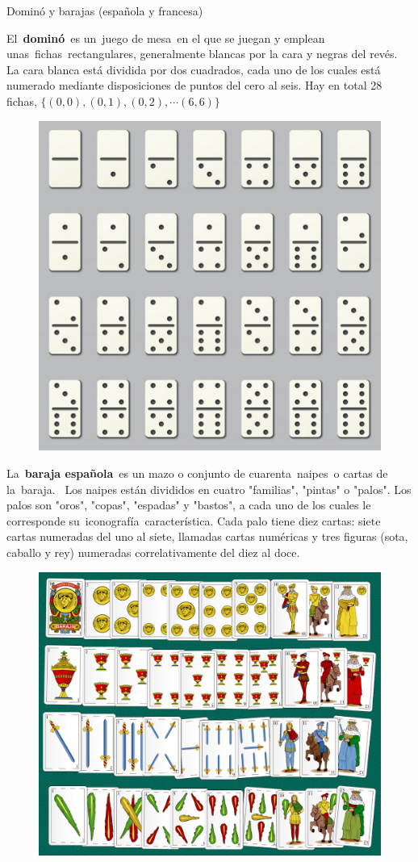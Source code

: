 \begin{myexampleblock}{Dominó y barajas (española y francesa)}

\begin{small}
El \textbf{dominó} es un juego de mesa en el que se juegan y emplean unas fichas rectangulares, generalmente blancas por la cara y negras del revés. La cara blanca está dividida por dos cuadrados, cada uno de los cuales está numerado mediante disposiciones de puntos del cero al seis. Hay en total 28 fichas,  $\{(0,0),(0,1),(0,2), \cdots (6,6)\}$
	\begin{figure}[H]
			\centering
			\includegraphics[width=.6\textwidth]{imagenes/imagenes02/T02IM19.png}
	\end{figure}

\vspace{2mm} La \textbf{baraja española} es un mazo o conjunto de cuarenta naipes o cartas de la baraja.  Los naipes están divididos en cuatro "familias", "pintas" o "palos". Los palos son "oros", "copas", "espadas" y "bastos", a cada uno de los cuales le corresponde su iconografía característica. Cada palo tiene diez cartas: siete cartas numeradas del uno al siete, llamadas cartas numéricas y tres figuras (sota, caballo y rey) numeradas correlativamente del diez al doce. 
	\begin{figure}[H]
			\centering
			\includegraphics[width=.6\textwidth]{imagenes/imagenes02/T02IM20.png}
	\end{figure}


\end{small}
\end{myexampleblock}

